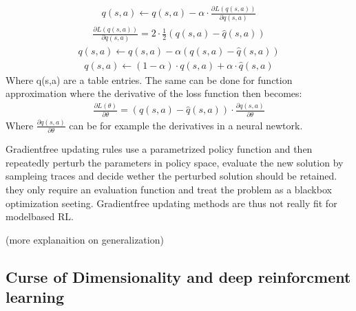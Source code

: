 \documentclass[letterpaper,10pt,english]{jupyterBook}
\begin{document}
\begin{equation*}
\begin{split} q(s,a) \leftarrow q(s,a) - \alpha \cdot \frac{\partial L(q(s,a))}{\partial q(s,a)} \end{split}
\end{equation*}\begin{equation*}
\begin{split} \frac{\partial L(q(s,a))}{\partial q(s,a)} = 2 \cdot \frac{1}{2}(q(s,a) - \hat{q}(s,a)) \end{split}
\end{equation*}\begin{equation*}
\begin{split} q(s,a) \leftarrow q(s,a) - \alpha(q(s,a) - \hat{q}(s,a)) \end{split}
\end{equation*}\begin{equation*}
\begin{split} q(s,a) \leftarrow (1- \alpha) \cdot q(s,a) + \alpha \cdot \hat{q}(s,a)  \end{split}
\end{equation*}
\sphinxAtStartPar
Where q(s,a) are a table entries. The same can be done for function approximation where the derivative of the loss function then becomes:
\begin{equation*}
\begin{split} \frac{\partial L(\theta)}{\partial \theta} = (q(s,a) - \hat{q}(s,a)) \cdot \frac{\partial q(s,a)}{\partial \theta} \end{split}
\end{equation*}
\sphinxAtStartPar
Where \(\frac{\partial q(s,a)}{\partial \theta}\) can be for example the derivatives in a neural newtork.

\sphinxAtStartPar
Gradient\sphinxhyphen{}free updating rules use a parametrized policy function and then repeatedly perturb the parameters in policy space, evaluate the new solution by sampleing traces and decide wether the perturbed solution should be retained. they only require an evaluation function and treat the problem as a black\sphinxhyphen{}box optimization seeting. Gradient\sphinxhyphen{}free updating methods are thus not really fit for model\sphinxhyphen{}based RL.

\sphinxAtStartPar
(more explanaition on generalization)


\subsection{Curse of Dimensionality and deep reinforcment learning}
\label{\detokenize{Reinforcement_learning:curse-of-dimensionality-and-deep-reinforcment-learning}}
\end{document}
